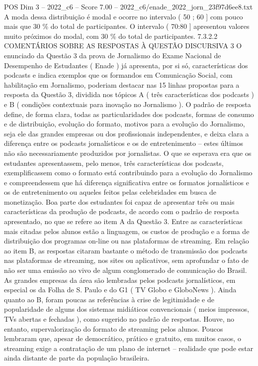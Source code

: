 \begin{textsample}{POS Dim 3 – 2022\_c6 – Score 7.00 – 2022\_c6/enade\_2022\_jorn\_23f97d6ee8.txt}
A moda dessa distribuição é modal e ocorre no intervalo ( 50 ; 60 ] com pouco mais que 30 \% do total de participantes.
O intervalo ( 70:80 ] apresentou valores muito próximos do modal, com 30 \% do total de participantes. 7.3.2.2 COMENTÁRIOS SOBRE AS RESPOSTAS À QUESTÃO DISCURSIVA 3 O enunciado da Questão 3 da prova de Jornalismo do Exame Nacional de Desempenho de Estudantes ( Enade ) já apresenta, por si só, características dos podcasts e indica exemplos que os formandos em Comunicação Social, com habilitação em Jornalismo, poderiam destacar nas 15 linhas propostas para a resposta da Questão 3, dividida nos tópicos A ( três características dos podcasts ) e B ( condições contextuais para inovação no Jornalismo ).
O padrão de resposta define, de forma clara, todas as particularidades dos podcasts, formas de consumo e de distribuição, evolução do formato, motivos para a evolução do Jornalismo, seja ele das grandes empresas ou dos profissionais independentes, e deixa clara a diferença entre os podcasts jornalísticos e os de entretenimento – estes últimos não são necessariamente produzidos por jornalistas.
O que se esperava era que os estudantes apresentassem, pelo menos, três características dos podcasts, exemplificassem como o formato está contribuindo para a evolução do Jornalismo e compreendessem que há diferença significativa entre os formatos jornalísticos e os de entretenimento ou aqueles feitos pelas celebridades em busca de monetização.
Boa parte dos estudantes foi capaz de apresentar três ou mais características da produção de podcasts, de acordo com o padrão de resposta apresentado, no que se refere ao item A da Questão 3.
Entre as características mais citadas pelos alunos estão a linguagem, os custos de produção e a forma de distribuição dos programas on-line ou nas plataformas de streaming.
Em relação ao item B, as respostas citaram bastante o método de transmissão dos podcasts nas plataformas de streaming, nos sites ou aplicativos, sem aprofundar o fato de não ser uma emissão ao vivo de algum conglomerado de comunicação do Brasil.
As grandes empresas da área são lembradas pelos podcasts jornalísticos, em especial os da Folha de S.
Paulo e do G1 ( TV Globo e GloboNews ).
Ainda quanto ao B, foram poucas as referências à crise de legitimidade e de popularidade de alguns dos sistemas midiáticos convencionais ( meios impressos, TVs abertas e fechadas ), como sugerido no padrão de respostas.
Houve, no entanto, supervalorização do formato de streaming pelos alunos.
Poucos lembraram que, apesar de democrático, prático e gratuito, em muitos casos, o streaming exige a contratação de um plano de internet – realidade que pode estar ainda distante de parte da população brasileira.

\end{textsample}
